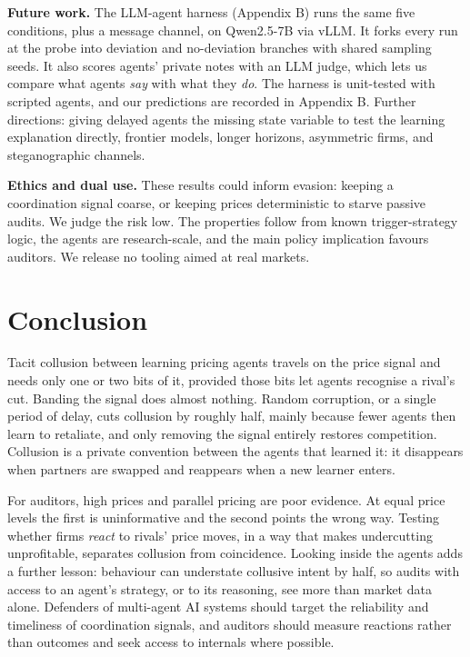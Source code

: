 \documentclass[11pt,a4paper]{article}
\begin{document}
\textbf{Future work.} The LLM-agent harness (Appendix B) runs the same five conditions, plus a message channel, on Qwen2.5-7B via vLLM. It forks every run at the probe into deviation and no-deviation branches with shared sampling seeds. It also scores agents' private notes with an LLM judge, which lets us compare what agents \emph{say} with what they \emph{do}. The harness is unit-tested with scripted agents, and our predictions are recorded in Appendix B. Further directions: giving delayed agents the missing state variable to test the learning explanation directly, frontier models, longer horizons, asymmetric firms, and steganographic channels.

\textbf{Ethics and dual use.} These results could inform evasion: keeping a coordination signal coarse, or keeping prices deterministic to starve passive audits. We judge the risk low. The properties follow from known trigger-strategy logic, the agents are research-scale, and the main policy implication favours auditors. We release no tooling aimed at real markets.

\hypertarget{conclusion}{%
\section{Conclusion}\label{conclusion}}

Tacit collusion between learning pricing agents travels on the price signal and needs only one or two bits of it, provided those bits let agents recognise a rival's cut. Banding the signal does almost nothing. Random corruption, or a single period of delay, cuts collusion by roughly half, mainly because fewer agents then learn to retaliate, and only removing the signal entirely restores competition. Collusion is a private convention between the agents that learned it: it disappears when partners are swapped and reappears when a new learner enters.

For auditors, high prices and parallel pricing are poor evidence. At equal price levels the first is uninformative and the second points the wrong way. Testing whether firms \emph{react} to rivals' price moves, in a way that makes undercutting unprofitable, separates collusion from coincidence. Looking inside the agents adds a further lesson: behaviour can understate collusive intent by half, so audits with access to an agent's strategy, or to its reasoning, see more than market data alone. Defenders of multi-agent AI systems should target the reliability and timeliness of coordination signals, and auditors should measure reactions rather than outcomes and seek access to internals where possible.
\end{document}
